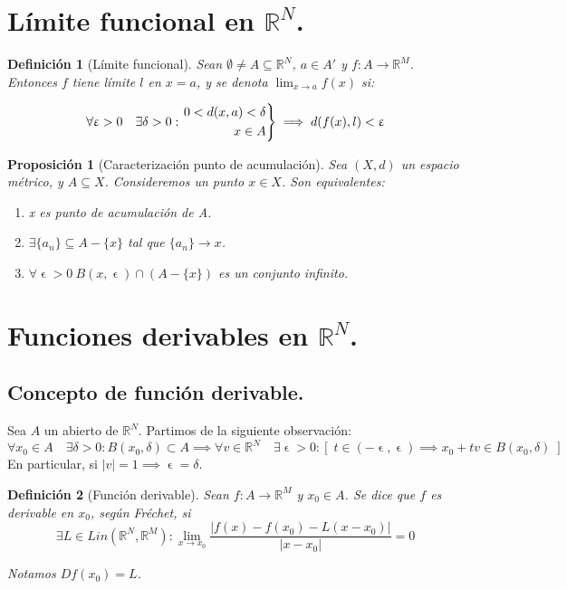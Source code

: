 \documentclass[11pt, a4paper, titlepage]{article}
\let\epsilon\upvarepsilon
\theoremstyle{theorem-style}
\newtheorem*{nprop}{Proposición}
\theoremstyle{definition-style}
\newtheorem*{ndef}{Definición}
\theoremstyle{remark-style}
\theoremstyle{example-style}
\newenvironment{nlist}
{\begin{enumerate}
\renewcommand\labelenumi{(\emph{\roman{enumi})}}}
{\end{enumerate}}
\newenvironment{rcases}
  {\left.\begin{aligned}}
  {\end{aligned}\right\rbrace}
\begin{document}
\section{Límite funcional en $\mathbb{R}^N$.}

\begin{ndef}[Límite funcional]
	Sean $\emptyset \ne A \subseteq \mathbb{R}^N$, $a\in A'$ y $f: A \longrightarrow \mathbb{R}^M$. Entonces $f$ tiene límite $l$ en $x=a$, y se denota $\displaystyle\lim_{x\to a} f(x)$ si:
	
\[
	\forall \epsilon>0\quad \exists \delta>0 : \begin{rcases}
	0<d(x,a)<\delta\\
	x\in A
\end{rcases} \implies d(f(x), l) < \epsilon
\]
\end{ndef}



\begin{nprop}[Caracterización punto de acumulación]
Sea $(X,d)$ un espacio métrico, y $A\subseteq X$. Consideremos un punto $x\in X$. Son equivalentes:

\begin{nlist}
\item x es punto de acumulación de A.
\item $\exists \{a_n\}\subseteq A-\{x\}$ tal que $\{a_n\} \rightarrow x$.
\item $\forall \epsilon > 0\ B(x,\epsilon)\cap (A-\{x\})$ es un conjunto infinito. 
\end{nlist}
\end{nprop}



\section{Funciones derivables en $\mathbb{R}^N$.}
\subsection{Concepto de función derivable.}

Sea $A$ un abierto de $\mathbb{R}^N$. Partimos de la siguiente observación:
\[
	\forall x_0 \in A\quad \exists \delta >0 : B(x_0, \delta) \subset A \implies \forall v \in \mathbb{R}^N\quad \exists \epsilon > 0 : [\; t \in (-\epsilon, \epsilon) \implies x_0+tv\in B(x_0,\delta)\;]
\]
 En particular, si $|v| = 1 \implies \epsilon = \delta$.
 
\begin{ndef}[Función derivable] Sean $f : A \longrightarrow \mathbb{R}^M$ y $x_0\in A$. Se dice que $f$ es derivable en $x_0$, según Fréchet, si
\[
	\exists L\in Lin(\mathbb{R}^N, \mathbb{R}^M) : \lim_{x\to x_0} \frac{|f(x)-f(x_0)- L(x-x_0)|}{|x-x_0|} =0
\]

Notamos $Df(x_0) = L$.
\end{ndef}
\end{document}
